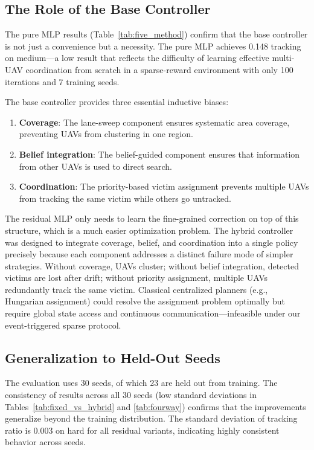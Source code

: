 \documentclass[journal]{IEEEtran}
\begin{document}
\subsection{The Role of the Base Controller}

The pure MLP results (Table~\ref{tab:five_method}) confirm that the base controller
is not just a convenience but a necessity. The pure MLP achieves 0.148 tracking on
medium---a low result that reflects the difficulty of learning effective multi-UAV
coordination from scratch in a sparse-reward environment with only 100 iterations
and 7 training seeds.

The base controller provides three essential inductive biases:
\begin{enumerate}
  \item \textbf{Coverage}: The lane-sweep component ensures systematic area coverage,
        preventing UAVs from clustering in one region.
  \item \textbf{Belief integration}: The belief-guided component ensures that
        information from other UAVs is used to direct search.
  \item \textbf{Coordination}: The priority-based victim assignment prevents multiple
        UAVs from tracking the same victim while others go untracked.
\end{enumerate}
The residual MLP only needs to learn the fine-grained correction on top of this
structure, which is a much easier optimization problem. The hybrid controller was
designed to integrate coverage, belief, and coordination into a single policy
precisely because each component addresses a distinct failure mode of simpler
strategies. Without coverage, UAVs cluster; without belief integration, detected
victims are lost after drift; without priority assignment, multiple UAVs redundantly
track the same victim. Classical centralized planners (e.g., Hungarian assignment)
could resolve the assignment problem optimally but require global state access and
continuous communication---infeasible under our event-triggered sparse protocol.

\subsection{Generalization to Held-Out Seeds}

The evaluation uses 30 seeds, of which 23 are held out from training. The consistency
of results across all 30 seeds (low standard deviations in Tables~\ref{tab:fixed_vs_hybrid}
and \ref{tab:fourway}) confirms that the improvements generalize beyond the training
distribution. The standard deviation of tracking ratio is 0.003 on hard for all
residual variants, indicating highly consistent behavior across seeds.
\end{document}
